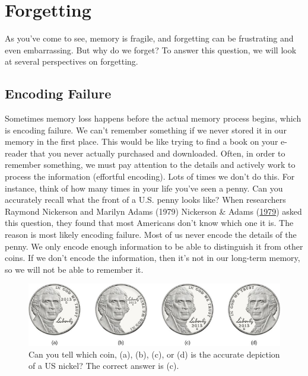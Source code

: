 \documentclass[
]{krantz}
\begin{document}
\hypertarget{forgetting}{%
\section{Forgetting}\label{forgetting}}

As you've come to see, memory is fragile, and forgetting can be frustrating and even embarrassing. But why do we forget? To answer this question, we will look at several perspectives on forgetting.

\hypertarget{encoding-failure}{%
\subsection*{Encoding Failure}\label{encoding-failure}}


Sometimes memory loss happens before the actual memory process begins, which is encoding failure. We can't remember something if we never stored it in our memory in the first place. This would be like trying to find a book on your e-reader that you never actually purchased and downloaded. Often, in order to remember something, we must pay attention to the details and actively work to process the information (effortful encoding). Lots of times we don't do this. For instance, think of how many times in your life you've seen a penny. Can you accurately recall what the front of a U.S. penny looks like? When researchers Raymond Nickerson and Marilyn Adams (1979) Nickerson \& Adams (\protect\hyperlink{ref-Nickerson1979}{1979}) asked this question, they found that most Americans don't know which one it is. The reason is most likely encoding failure. Most of us never encode the details of the penny. We only encode enough information to be able to distinguish it from other coins. If we don't encode the information, then it's not in our long-term memory, so we will not be able to remember it.

\begin{figure}

{\centering \includegraphics[width=0.8\linewidth]{images/ch6/fig3} 

}

\caption{Can you tell which coin, (a), (b), (c), or (d) is the accurate depiction of a US nickel? The correct answer is (c).}\label{fig:nickel}
\end{figure}
\end{document}

